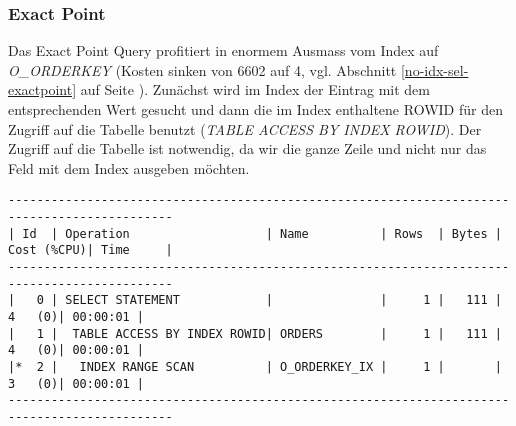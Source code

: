 \documentclass[11pt,a4paper,parskip=half]{scrartcl}
\begin{document}
\subsubsection{Exact Point}
Das Exact Point Query profitiert in enormem Ausmass vom Index auf \emph{O\_ORDERKEY} (Kosten sinken von 6602 auf 4, vgl. Abschnitt \ref{no-idx-sel-exactpoint} auf Seite \pageref{no-idx-sel-exactpoint}). Zunächst wird im Index der Eintrag mit dem entsprechenden Wert gesucht und dann die im Index enthaltene ROWID für den Zugriff auf die Tabelle benutzt (\emph{TABLE ACCESS BY INDEX ROWID}). Der Zugriff auf die Tabelle ist notwendig, da wir die ganze Zeile und nicht nur das Feld mit dem Index ausgeben möchten.
\begin{lstlisting}
---------------------------------------------------------------------------------------------                                                                                                                                                                                                                
| Id  | Operation                   | Name          | Rows  | Bytes | Cost (%CPU)| Time     |                                                                                                                                                                                                                
---------------------------------------------------------------------------------------------                                                                                                                                                                                                                
|   0 | SELECT STATEMENT            |               |     1 |   111 |     4   (0)| 00:00:01 |                                                                                                                                                                                                                
|   1 |  TABLE ACCESS BY INDEX ROWID| ORDERS        |     1 |   111 |     4   (0)| 00:00:01 |                                                                                                                                                                                                                
|*  2 |   INDEX RANGE SCAN          | O_ORDERKEY_IX |     1 |       |     3   (0)| 00:00:01 |                                                                                                                                                                                                                
---------------------------------------------------------------------------------------------                                                                                                                                                                                                                
                                                                                                                                                                                                                                                                                                             

\end{lstlisting}
\end{document}
